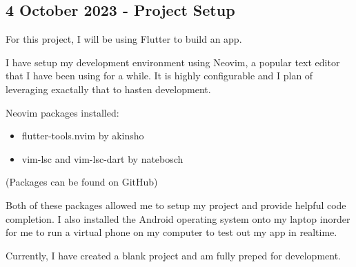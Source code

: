 \documentclass{article}
\begin{document}
\subsection{4 October 2023 - Project Setup}

For this project, I will be using Flutter to build an app.

I have setup my development environment using Neovim, a popular text editor that I have been using for a while. It is highly configurable and I plan of leveraging exactally that to hasten development.

Neovim packages installed:
\begin{itemize}
				\item flutter-tools.nvim by akinsho
				\item vim-lsc and vim-lsc-dart by natebosch
\end{itemize}

(Packages can be found on GitHub)

Both of these packages allowed me to setup my project and provide helpful code completion. I also installed the Android operating system onto my laptop inorder for me to run a virtual phone on my computer to test out my app in realtime.

Currently, I have created a blank project and am fully preped for development.
\end{document}
